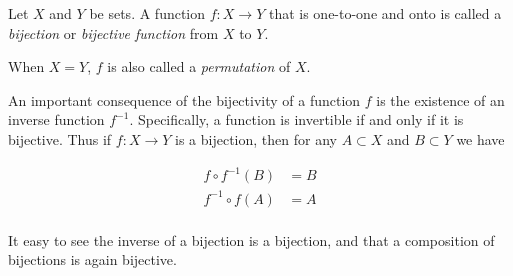\documentclass[12pt]{article}
\begin{document}
Let $X$ and $Y$ be sets. A function $f\colon X\to Y$ that is one-to-one and onto is called a \emph{bijection} or \emph{bijective function} from $X$ to $Y$.

When $X=Y$, $f$ is also called a \emph{permutation} of $X$.

An important consequence of the bijectivity of a function $f$ is the existence of an inverse function $f^{-1}$.  Specifically, a function is invertible if and only if it is bijective.  Thus if $f:X\rightarrow Y$ is a bijection, then for any $A\subset X$ and $B\subset Y$ we have 

\begin{align*}
f\circ f^{-1}(B)&=B\\
f^{-1}\circ f(A)&=A\\
\end{align*}

It easy to see the inverse of a bijection is a bijection, and that a composition of bijections is again bijective.
\end{document}
